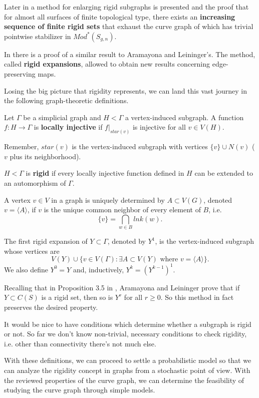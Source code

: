 Later in \cite[Aramayona, Leininger 16]{exhaustingCurveComplex} a method for enlarging rigid subgraphs is presented and the proof that for almost all surfaces of finite topological type, there exists an \textbf{increasing sequence of finite rigid sets} that exhaust the curve graph of which has trivial pointwise stabilizer in $Mod^{\ast}(S_{g,n})$.

In \cite[Hernández 19]{exhaustionCurveGraph} there is a proof of a similar result to Aramayona and Leininger's. The method,  called \textbf{rigid expansions}, allowed to obtain new results concerning edge-preserving maps. 

Losing the big picture that rigidity represents, we can land this vast journey in the following graph-theoretic definitions.

\begin{defini}
Let $\Gamma$ be a simplicial graph and $H<\Gamma$ a vertex-induced subgraph. A function $f:H\to \Gamma$ is \textbf{locally injective} if $f|_{star(v)}$ is injective for all $v \in V(H)$. 
\end{defini}

\begin{nota}
Remember, $star(v)$ is the vertex-induced subgraph with vertices $\{ v \} \cup N(v)$ ($v$ plus its neighborhood).
\end{nota}

\begin{defini}
$H<\Gamma$ is \textbf{rigid} if every locally injective function defined in $H$ can be extended to an automorphism of $\Gamma$. \end{defini}

A vertex $v \in V$ in a graph is uniquely determined by $A\subset V(G)$, denoted $v=\langle A \rangle$, if $v$ is the unique common neighbor of every element of $B$, i.e.
$$ \{ v \} = \bigcap_{w\in B} lnk(w).$$
\begin{defini}
The first rigid expansion of $Y\subset \Gamma$, denoted by $Y^{1}$, is the vertex-induced subgraph whose vertices are
$$ V(Y) \cup \{ v\in V(\Gamma) :  \exists A \subset V(Y) \text{ where } v = \langle A \rangle  \}.$$
We also define $Y^{0} = Y$ and, inductively, $Y^{k} = (Y^{k-1})^{1}$.
\end{defini}

Recalling that in Proposition 3.5 in \cite[Aramayona, Leininger 16]{finiteRigidSetsJA}, Aramayona and Leininger prove that if $Y \subset C(S)$ is a rigid set, then so is $Y^{r} $ for all $r \geq 0$. So this method in fact preserves the desired property.

It would be nice to have conditions which determine whether a subgraph is rigid or not. So far we don't know non-trivial, necessary conditions to check rigidity, i.e. other than connectivity there's not much else.

With these definitions, we can proceed to settle a probabilistic model so that we can analyze the rigidity concept in graphs from a stochastic point of view. With the reviewed properties of the curve graph, we can determine the feasibility of studying the curve graph through simple models.